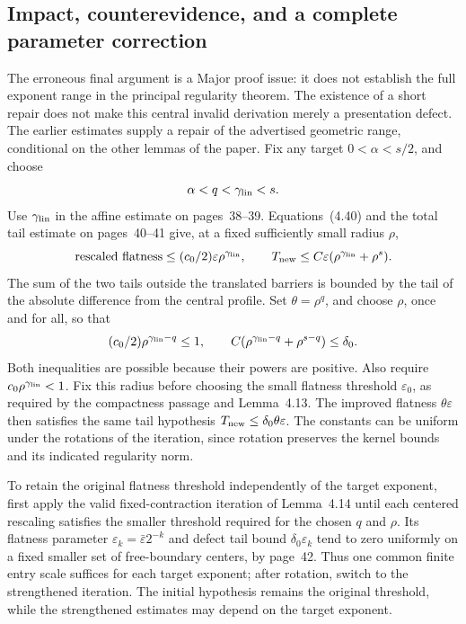 \documentclass[10pt]{article}
\begin{document}
\subsection*{Impact, counterevidence, and a complete parameter correction}
The erroneous final argument is a Major proof issue: it does not establish the full exponent range in the principal regularity theorem. The existence of a short repair does not make this central invalid derivation merely a presentation defect. The earlier estimates supply a repair of the advertised geometric range, conditional on the other lemmas of the paper. Fix any target \(0<\alpha<s/2\), and choose \[\alpha<q<\gamma_{\rm lin}<s .\] Use \(\gamma_{\rm lin}\) in the affine estimate on pages 38–39. Equations (4.40) and the total tail estimate on pages 40–41 give, at a fixed sufficiently small radius \(\rho\), \[\text{rescaled flatness}\le (c_0/2)\varepsilon\rho^{\gamma_{\rm lin}},
 \qquad
 T_{\rm new}\le C\varepsilon
       (\rho^{\gamma_{\rm lin}}+\rho^s).\] The sum of the two tails outside the translated barriers is bounded by the tail of the absolute difference from the central profile. Set \(\theta=\rho^q\), and choose \(\rho\), once and for all, so that \[(c_0/2)\rho^{\gamma_{\rm lin}-q}\le1,\qquad
 C(\rho^{\gamma_{\rm lin}-q}+\rho^{s-q})\le\delta_0 .\] Both inequalities are possible because their powers are positive. Also require \(c_0\rho^{\gamma_{\rm lin}}<1\). Fix this radius before choosing the small flatness threshold \(\varepsilon_0\), as required by the compactness passage and Lemma 4.13. The improved flatness \(\theta\varepsilon\) then satisfies the same tail hypothesis \(T_{\rm new}\le\delta_0\theta\varepsilon\). The constants can be uniform under the rotations of the iteration, since rotation preserves the kernel bounds and its indicated regularity norm.\par
To retain the original flatness threshold independently of the target exponent, first apply the valid fixed-contraction iteration of Lemma 4.14 until each centered rescaling satisfies the smaller threshold required for the chosen \(q\) and \(\rho\). Its flatness parameter \(\varepsilon_k=\bar\varepsilon 2^{-k}\) and defect tail bound \(\delta_0\varepsilon_k\) tend to zero uniformly on a fixed smaller set of free-boundary centers, by page 42. Thus one common finite entry scale suffices for each target exponent; after rotation, switch to the strengthened iteration. The initial hypothesis remains the original threshold, while the strengthened estimates may depend on the target exponent.\par
\end{document}
